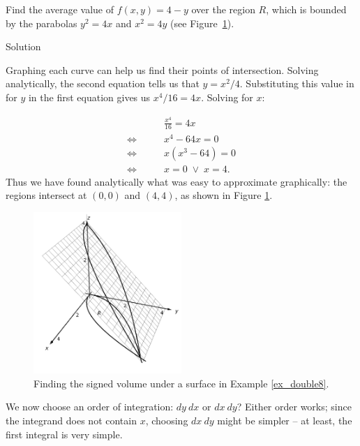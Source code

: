 \begin{example}\label{ex_double8}
Find the average value of $f(x,y) = 4-y$ over the region $R$, which is bounded by the parabolas $y^2=4x$ and $x^2=4y$ (see Figure~\ref{fig_multiple_11}). 




Solution 

Graphing each curve can help us find their points of intersection. Solving analytically, the second equation tells us that $y=x^2/4$. Substituting this value in for $y$ in the first equation gives us $x^4/16 = 4x$. Solving for $x$:

\allowdisplaybreaks
\begin{align*}
& \qquad \frac{x^4}{16} = 4x\\
\Leftrightarrow & \qquad x^4-64x = 0\\
\Leftrightarrow & \qquad x(x^3-64)  = 0\\
\Leftrightarrow & \qquad x = 0 \;  \vee \;  x = 4.
\end{align*}
Thus we have found analytically what was easy to approximate graphically: the regions intersect at $(0,0)$ and $(4,4)$, as shown in Figure \ref{fig_multiple_11}. 

\begin{figure}[H]
	\begin{center}
			\includegraphics[width=0.5\textwidth]{fig_multiple_11}
	\caption{Finding the signed volume under a surface in Example \ref{ex_double8}.}
	\label{fig_multiple_11}
	\end{center}
\end{figure}

We now choose an order of integration: $dy\ dx$ or $dx\ dy$? Either order works; since the integrand does not contain $x$, choosing $dx\ dy$ might be simpler -- at least, the first integral is very simple.


\end{example}
